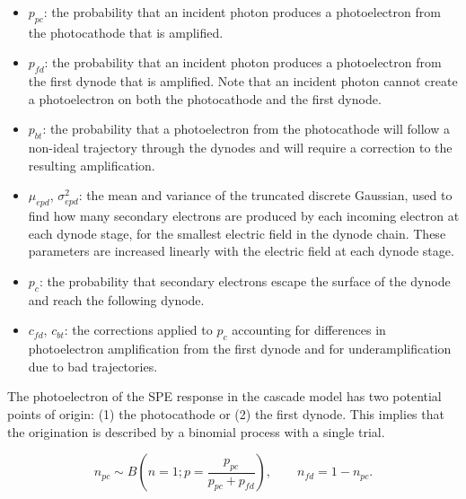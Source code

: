 \begin{itemize}
    \item $p_{pc}$: the probability that an incident photon produces a photoelectron from the photocathode that is amplified.
    \item $p_{fd}$: the probability that an incident photon produces a photoelectron from the first dynode that is amplified.  Note that an incident photon cannot create a photoelectron on both the photocathode and the first dynode.
    \item $p_{bt}$: the probability that a photoelectron from the photocathode will follow a non-ideal trajectory through the dynodes and will require a correction to the resulting amplification.
    \item $\mu_{epd}$, $\sigma_{epd}^2$: the mean and variance of the truncated discrete Gaussian, used to find how many secondary electrons are produced by each incoming electron at each dynode stage, for the smallest electric field in the dynode chain.  These parameters are increased linearly with the electric field at each dynode stage.
    \item $p_c$: the probability that secondary electrons escape the surface of the dynode and reach the following dynode.
    \item $c_{fd}$, $c_{bt}$: the corrections applied to $p_c$ accounting for differences in photoelectron amplification from the first dynode and for underamplification due to bad trajectories.


    
\end{itemize}


The photoelectron of the SPE response in the cascade model has two potential points of origin: (1) the photocathode or (2) the first dynode.  This implies that the origination is described by a binomial process with a single trial.

\begin{equation}
        n_{pc} \sim B\left(n=1; p=\frac{p_{pc}}{p_{pc}+p_{fd}}\right), \qquad
        n_{fd} = 1 - n_{pc}.
\end{equation}

